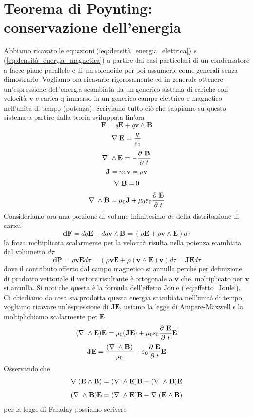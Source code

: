 \documentclass[
10pt, %
a4paper, %
oneside, %
headinclude,footinclude, %
BCOR5mm, %
]{scrartcl}
\begin{document}
\section{Teorema di Poynting: conservazione dell'energia}
Abbiamo ricavato le equazioni (\ref{eq:densità_energia_elettrica}) e (\ref{eq:densità_energia_magnetica}) a partire dai casi particolari di un condensatore a facce piane parallele e di un solenoide per poi assumerle come generali senza dimostrarlo. Vogliamo ora ricavarle rigorosamente ed in generale ottenere un'espressione dell'energia scambiata da un generico sistema di cariche con velocità \(\mathbf{v}\) e carica q immerso in un generico campo elettrico e magnetico nell'unità di tempo (potenza). Scriviamo tutto ciò che sappiamo su questo sistema a partire dalla teoria sviluppata fin'ora
\[\mathbf{F} = q\mathbf{E}+q\mathbf{v}\wedge\mathbf{B}\]
\[\nabla\ \mathbf{E} = \frac{q}{\varepsilon_0}\]
\[\nabla\ \wedge\mathbf{E} = -\frac{\partial\  \mathbf{B}}{\partial\  t}\]
\[\mathbf{J} = n e \mathbf{v} = \rho \mathbf{v}\]
\[\nabla\ \mathbf{B} = 0\]
\[\nabla\ \wedge\mathbf{B} = \mu_0\mathbf{J}+\mu_0\varepsilon_0\frac{\partial\ \mathbf{E}}{\partial\  t}\]
Consideriamo ora una porzione di volume infinitesimo \(d\tau\) della distribuzione di carica
\[\mathbf{dF} = dq\mathbf{E} + dq\mathbf{v}\wedge\mathbf{B} = (\rho\mathbf{E} + \rho \mathbf{v}\wedge\mathbf{E})d\tau\]
la forza moltiplicata scalarmente per la velocità risulta nella potenza scambiata dal volumetto $d\tau$
\[\mathbf{dP} = \rho\mathbf{v}\mathbf{E}d\tau = (\rho\mathbf{v}\mathbf{E} + \rho (\mathbf{v}\wedge\mathbf{E})\mathbf{v})d\tau = \mathbf{J}\mathbf{E}d\tau\]
dove il contributo offerto dal campo magnetico si annulla perché per definizione di prodotto vettoriale il vettore risultante è ortogonale a \(\mathbf{v}\) che, moltiplicato per \(\mathbf{v}\) si annulla. Si noti che questa è la formula dell'effetto Joule (\ref{eq:effetto_Joule}).\\
Ci chiediamo da cosa sia prodotta questa energia scambiata nell'unità di tempo, vogliamo ricavare un'espressione di \(\mathbf{J}\mathbf{E}\), usiamo la legge di Ampere-Maxwell e la moltiplichiamo scalarmente per \(\mathbf{E}\)
\[(\nabla\ \wedge\mathbf{E})\mathbf{E} = \mu_0(\mathbf{J}\mathbf{E}) + \mu_0\varepsilon_0 \frac{\partial\  \mathbf{E}}{\partial\  t}\mathbf{E}\]
\[\mathbf{J}\mathbf{E} = \frac{(\nabla\ \wedge\mathbf{B})}{\mu_0}-\varepsilon_0\frac{\partial\  \mathbf{E}}{\partial\  t}\mathbf{E}\]
Osservando che
\[\nabla\ (\mathbf{E}\wedge\mathbf{B}) = (\nabla\ \wedge\mathbf{E})\mathbf{B}-(\nabla\ \wedge\mathbf{B})\mathbf{E}\]
\[(\nabla\ \wedge\mathbf{B})\mathbf{E} = (\nabla\ \wedge\mathbf{E})\mathbf{B}- \nabla\ (\mathbf{E}\wedge\mathbf{B})\]
per la legge di Faraday possiamo scrivere
\end{document}
